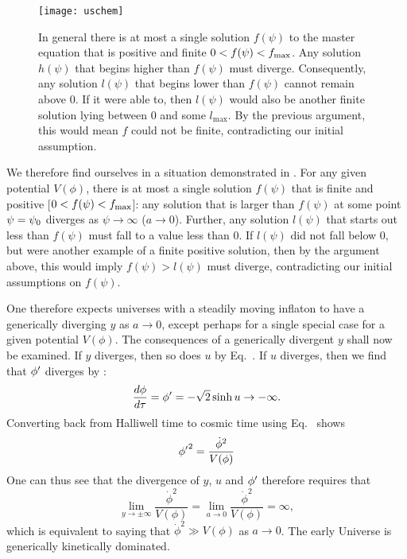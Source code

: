 %
\begin{figure}
  \texttt{[image: uschem]}
  \caption{In general there is at most a single solution $f(\psi)$ to
    the master equation \protect{} that is positive
    and finite $0<f(\psi)<f_\mathrm{max}$. Any solution $h(\psi)$ that begins
    higher than $f(\psi)$ must diverge. Consequently, any solution
    $l(\psi)$ that begins lower than $f(\psi)$ cannot remain above
    $0$. If it were able to, then $l(\psi)$ would also be another
    finite solution lying between $0$ and some $l_\mathrm{max}$. By
    the previous argument, this would mean $f$ could not be finite,
    contradicting our initial assumption.  }
  \label{fig:figure_uschem}
\end{figure}
%
We therefore find ourselves in a situation demonstrated in
. For any given potential $V(\phi)$, there is
at most a single solution $f(\psi)$ that is finite and positive
[$0<f(\psi)<f_\mathrm{max}$]: any solution that is larger than $f(\psi)$ at some
point $\psi=\psi_0$ diverges as $\psi\to\infty$ ($a\to0$). Further, any
solution $l(\psi)$ that starts out less than $f(\psi)$ must fall to a
value less than $0$.  If $l(\psi)$ did not fall below $0$, but were
another example of a finite positive solution, then by the argument
above, this would imply $f(\psi)>l(\psi)$ must diverge, contradicting
our initial assumptions on $f(\psi)$.

One therefore expects universes with a steadily moving inflaton to
have a generically diverging $y$ as $a\to0$, except perhaps for a
single special case for a given potential $V(\phi)$.  The consequences
of a generically divergent $y$ shall now be examined.  If $y$
diverges, then so does $u$ by Eq.\ . If $u$
diverges, then we find that ${{\phi}^\prime}$ diverges by
:
%
\begin{equation}
  \frac{d\phi}{d\tau}={{\phi}^\prime} 
  = 
  -\sqrt{2}\sinh u\rightarrow -\infty.
\end{equation}
%
Converting back from Halliwell time to cosmic time using Eq.\
 shows
%
\begin{equation}
  {{\phi}^\prime}^2 
  = 
  \frac{\dot{\phi}^2}{V(\phi)}
\end{equation}
%
One can thus see that the divergence of $y$, $u$ and ${{\phi}^\prime}$
therefore requires that
%
\begin{equation}
  \lim\limits_{y\to\pm\infty} \frac{\dot\phi^2}{V(\phi)}
  =
  \lim\limits_{a\to 0} \frac{\dot\phi^2}{V(\phi)} = \infty,
  \label{eqn:kdfinal}
\end{equation}
%
which is equivalent to saying that $\dot{\phi}^2\gg V(\phi)$ as
$a\to0$. The early Universe is generically kinetically dominated.

